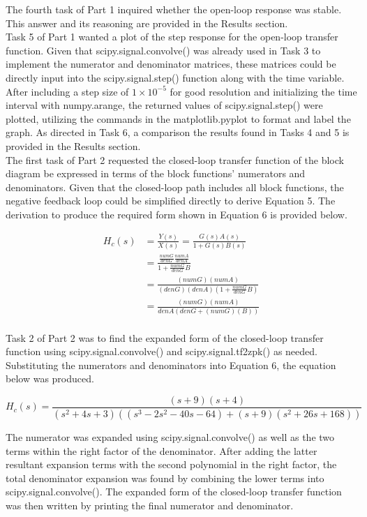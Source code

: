 \documentclass[12pt]{report}
\begin{document}
The fourth task of Part 1 inquired whether the open-loop response was stable. This answer and its reasoning are provided in the Results section. \\

Task 5 of Part 1 wanted a plot of the step response for the open-loop transfer function. Given that scipy.signal.convolve() was already used in Task 3 to implement the numerator and denominator matrices, these matrices could be directly input into the scipy.signal.step() function along with the time variable.  After including a step size of $ 1\times 10^{-5} $ for good resolution and initializing the time interval with numpy.arange, the returned values of scipy.signal.step() were plotted, utilizing the commands in the matplotlib.pyplot to format and label the graph. As directed in Task 6, a comparison the results found in Tasks 4 and 5 is provided in the Results section.  \\

The first task of Part 2 requested the closed-loop transfer function of the block diagram be expressed in terms of the block functions' numerators and denominators. Given that the closed-loop path includes all block functions, the negative feedback loop could be simplified directly to derive Equation 5. The derivation to produce the required form shown in Equation 6 is provided below.

\begin{align*}
	H_c(s) &= \frac{Y(s)}{X(s)} = \frac{G(s)A(s)}{1 + G(s)B(s)} \\
	&= \frac{\frac{numG}{denG}\frac{numA}{denA}}{1 + \frac{numG}{denG}B} \\
	&= \frac{(numG)(numA)}{(denG)(denA)(1 + \frac{numG}{denG}B)} \\
	&= \frac{(numG)(numA)}{denA(denG + (numG)(B))} \\
\end{align*}

Task 2 of Part 2 was to find the expanded form of the closed-loop transfer function using scipy.signal.convolve() and scipy.signal.tf2zpk() as needed. Substituting the numerators and denominators into Equation 6, the equation below was produced.

\begin{equation*}
	H_c(s) = \frac{(s + 9)(s + 4)}{(s^2 + 4s + 3)((s^3 - 2s^2 - 40s - 64) + (s + 9)(s^2 + 26s + 168))}
\end{equation*}

The numerator was expanded using scipy.signal.convolve() as well as the two terms within the right factor of the denominator. After adding the latter resultant expansion terms with the second polynomial in the right factor, the total denominator expansion was found by combining the lower terms into scipy.signal.convolve(). The expanded form of the closed-loop transfer function was then written by printing the final numerator and denominator. \\
\end{document}
